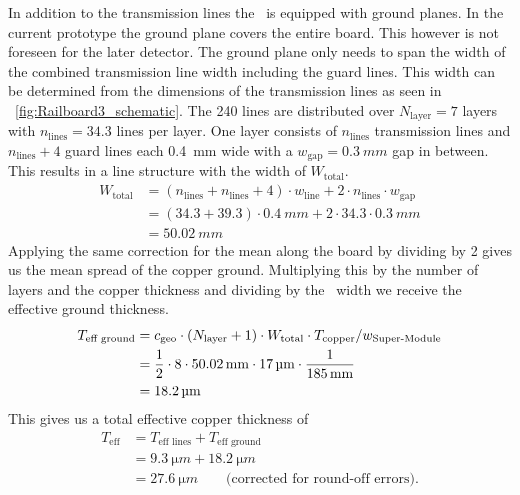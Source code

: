 \documentclass[../BTOF_summary.tex]{subfiles}
\begin{document}
In addition to the transmission lines the \railboard\ is equipped with ground planes.
In the current prototype the ground plane covers the entire board.
This however is not foreseen for the later detector.
The ground plane only needs to span the width of the combined transmission line width including the guard lines.
This width can be determined from the dimensions of the transmission lines as seen in \fig~\ref{fig:Railboard3_schematic}.
The 240 lines are distributed over $N_\text{layer} = 7$ layers with $n_\text{lines} = 34.3$ lines per layer.
One layer consists of $n_\text{lines}$ transmission lines and $n_\text{lines}+4$ guard lines each \SI{0.4}{mm} wide with a $w_\text{gap} = \SI{0.3}{mm}$ gap in between.
This results in a line structure with the width of $W_\text{total}$.
\begin{align}
	W_\text{total} 	&= \left(n_\text{lines} + n_\text{lines} + 4\right) \cdot w_\text{line} + 2 \cdot n_\text{lines} \cdot w_\text{gap} \\
	 	&= \left(34.3 + 39.3\right) \cdot \SI{0.4}{mm} + 2 \cdot 34.3 \cdot \SI{0.3}{mm} \\
					&= \SI{50.02}{mm}
\end{align}
Applying the same correction for the mean along the board by dividing by 2 gives us the mean spread of the copper ground.
Multiplying this by the number of layers and the copper thickness and dividing by the \sm\ width we receive the effective ground thickness.
\begin{align}
	T_{\text{eff ground}} &= c_\text{geo} \cdot \left(N_\text{layer} + 1 \right) \cdot W_\text{total} \cdot T_\text{copper} / w_\text{Super-Module} \\
	&= \frac{1}{2} \cdot 8 \cdot \SI{50.02}{mm} \cdot \SI{17}{\micro m} \cdot \frac{1}{\SI{185}{mm}} \\
	&= \SI{18.2}{\micro m}
\end{align}
This gives us a total effective copper thickness of
\begin{align}
	T_\text{eff} &= T_\text{eff lines} + T_\text{eff ground} \\
	&= \SI{9.3}{\micro m} + \SI{18.2}{\micro m} \\
	&= \SI{27.6}{\micro m} \qquad \text{(corrected for round-off errors)}.
\end{align}
\end{document}
